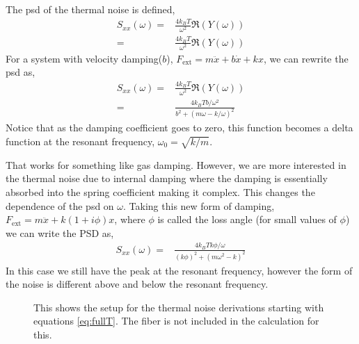 The \ac{psd} of the thermal noise is defined,
\begin{align}
S_{xx}(\omega) =& \frac{4 k_B T}{\omega^2} \Re (Y(\omega)) \\
    =& \frac{4 k_B T}{\omega^2} \Re (Y(\omega))
\end{align}
For a system with velocity damping($b$), $F_{\mathrm{ext}} = m\ddot{x} + b\dot{x} + kx$,
we can rewrite the \ac{psd} as,
\begin{align}
S_{xx}(\omega) =& \frac{4 k_B T}{\omega^2} \Re (Y(\omega)) \\
    =& \frac{4 k_B T b / \omega^2}{ b^2 + (m \omega - k/\omega)^2}
\end{align}
Notice that as the damping coefficient goes to zero, this function becomes a
delta function at the resonant frequency, $\omega_0 = \sqrt{k/m}$.

That works for something like gas damping. However, we are more interested in
the thermal noise due to internal damping where the damping is essentially
absorbed into the spring coefficient making it complex. This changes the
dependence of the \ac{psd} on $\omega$. Taking this new form of damping,
$F_{\mathrm{ext}} = m\ddot{x} + k(1+i\phi)x$, where $\phi$ is called the
loss angle (for small values of $\phi$) we can write the PSD as,
\begin{align}
S_{xx}(\omega) = & \frac{4 k_B T k \phi / \omega}{(k \phi)^2 +
    (m \omega^2 - k)^2}
\end{align}
In this case we still have the peak at the resonant frequency, however the form
of the noise is different above and below the resonant frequency.

\begin{figure}
\centering
  \caption[Sketch of Thermal Noise Calculation]{
    This shows the setup for the thermal noise derivations starting with
    equations \ref{eq:fullT}.
    The fiber is not included in the calculation for this.
    }
  \label{fig:tnoisesketch}
\end{figure}

